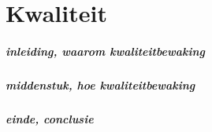 \chapter{Kwaliteit} 

\paragraph{inleiding, waarom kwaliteitbewaking}
\paragraph{middenstuk, hoe kwaliteitbewaking}
\paragraph{einde, conclusie}